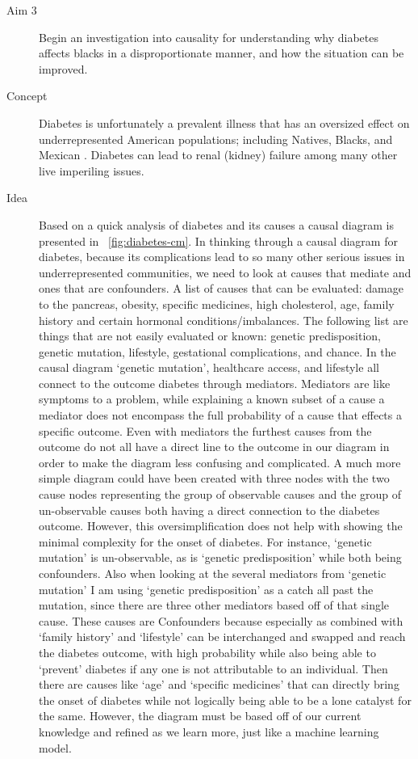 \begin{description}
	\item[Aim 3] Begin an investigation into causality for understanding why diabetes affects blacks in a disproportionate manner, and how the situation can be improved.
	\item[Concept] Diabetes is unfortunately a prevalent illness that has an oversized effect on underrepresented American populations; including Natives, Blacks, and Mexican \cite{Winer:2004}. Diabetes can lead to renal (kidney) failure among many other live imperiling issues.
	\item[Idea] Based on a quick analysis of diabetes and its causes a causal diagram is presented in ~\ref{fig:diabetes-cm}. In thinking through a causal diagram for diabetes, because its complications lead to so many other serious issues in underrepresented communities, we need to look at causes that mediate and ones that are confounders.
 A list of causes that can be evaluated: damage to the pancreas, obesity, specific medicines, high cholesterol, age, family history and certain hormonal conditions/imbalances. 
 The following list are things that are not easily evaluated or known: genetic predisposition, genetic mutation, lifestyle, gestational complications, and chance.
In the causal diagram `genetic mutation', healthcare access, and lifestyle all connect to the outcome diabetes through mediators.
Mediators are like symptoms to a problem, while explaining a known subset of a cause a mediator does not encompass the full probability of a cause that effects a specific outcome.
Even with mediators the furthest causes from the outcome do not all have a direct line to the outcome in our diagram in order to make the diagram less confusing and complicated.
A much more simple diagram could have been created with three nodes with the two cause nodes representing the group of observable causes and the group of un-observable causes both having a direct connection to the diabetes outcome.
However, this oversimplification does not help with showing the minimal complexity for the onset of diabetes.
For instance, `genetic mutation' is un-observable, as is `genetic predisposition' while both being confounders.
Also when looking at the several mediators from `genetic mutation' I am using `genetic predisposition' as a catch all past the mutation, since there are three other mediators based off of that single cause.
These causes are Confounders because especially as combined with `family history' and `lifestyle' can be interchanged and swapped and reach the diabetes outcome, with high probability while also being able to `prevent' diabetes if any one is not attributable to an individual.
Then there are causes like `age' and `specific medicines' that can directly bring the onset of diabetes while not logically being able to be a lone catalyst for the same.
However, the diagram must be based off of our current knowledge and refined as we learn more, just like a machine learning model. 
\end{description}

